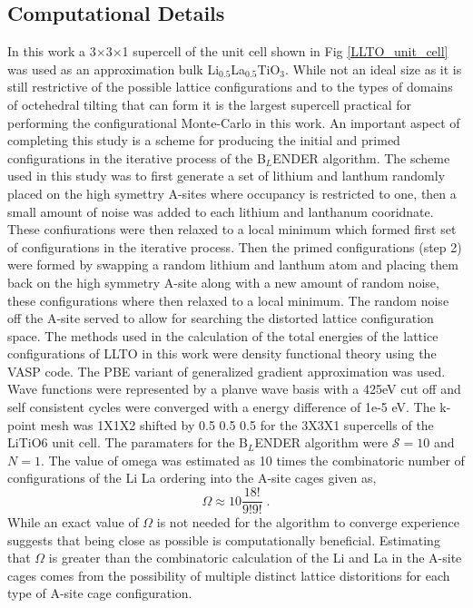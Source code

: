 \documentclass[aps,prl,reprint,superscriptaddress,showkeys]{revtex4-1}
\begin{document}
\subsection{Computational Details}
In this work a 3$\times$3$\times$1 supercell of the unit cell shown in Fig \ref{LLTO_unit_cell} was used as an approximation bulk Li$_{0.5}$La$_{0.5}$TiO$_{3}$. While not an ideal size as it is still restrictive of the possible lattice configurations and to the types of domains of octehedral tilting that can form it is the largest supercell practical for performing the configurational Monte-Carlo in this work. An important aspect of completing this study is a scheme for producing the initial and primed configurations in the iterative process of the B$_L$ENDER algorithm. The scheme used in this study was to first generate a set of lithium and lanthum randomly placed on the high symettry A-sites where occupancy is restricted to one, then a small amount of noise was added to each lithium and lanthanum cooridnate. These confiurations were then relaxed to a local minimum which formed first set of configurations in the iterative process.  Then the primed configurations (step 2) were formed by swapping a random lithium and lanthum atom and placing them back on the high symmetry A-site along with a new amount of random noise, these configurations where then relaxed to a local minimum. The random noise off the A-site served to allow for searching the distorted lattice configuration space. 
The methods used in the calculation of the total energies of the lattice configurations of LLTO in this work were density functional theory using the VASP code. The PBE variant of generalized gradient approximation was used.  Wave functions were represented by a planve wave basis with a 425eV cut off and self consistent cycles were converged with a energy difference of 1e-5 eV. The k-point mesh was 1X1X2 shifted by 0.5 0.5 0.5 for the 3X3X1 supercells of the LiTiO6 unit cell. The paramaters for the B$_L$ENDER algorithm were $\mathcal{S}=10$ and $N=1$. The value of omega was estimated as 10 times the combinatoric number of configurations of the Li La ordering into the A-site cages given as, 
\begin{equation}
\Omega \approx 10\frac{18!}{9!9!} \;.
\end{equation}
While an exact value of $\Omega$ is not needed for the algorithm to converge experience suggests that being close as possible is computationally beneficial. Estimating that $\Omega$ is greater than the combinatoric calculation of the Li and La in the A-site cages comes from the possibility of multiple distinct lattice distoritions for each type of A-site cage configuration. 
\end{document}
